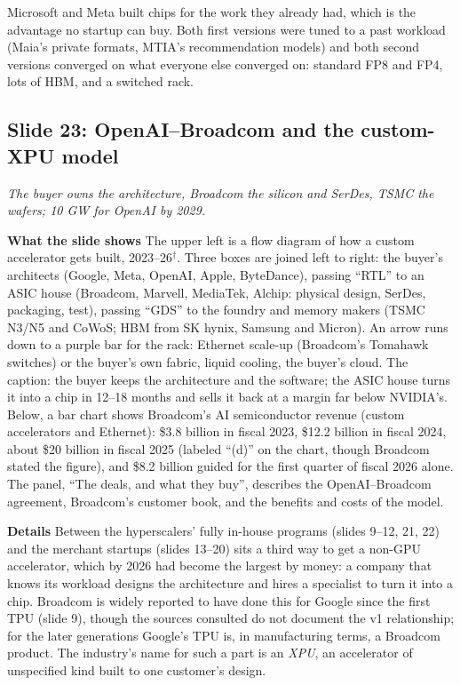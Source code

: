 \documentclass[11pt,letterpaper]{article}
\newcommand{\slide}[3]{%
  \subsection[Slide #1: #2]{Slide #1: #2}%
  {\color{muted}\itshape #3\par}\medskip}
\newcommand{\para}[1]{\medskip\noindent\textbf{#1}\quad}
\newenvironment{intuition}{\begin{tcolorbox}[intuitionbox]}{\end{tcolorbox}}
\begin{document}
\begin{intuition}
Microsoft and Meta built chips for the work they already had, which is the advantage no startup can buy. Both first versions were tuned to a past workload (Maia's private formats, MTIA's recommendation models) and both second versions converged on what everyone else converged on: standard FP8 and FP4, lots of HBM, and a switched rack.
\end{intuition}

\slide{23}{OpenAI--Broadcom and the custom-XPU model}{The buyer owns the architecture, Broadcom the silicon and SerDes, TSMC the wafers; 10 GW for OpenAI by 2029.}

\para{What the slide shows} The upper left is a flow diagram of how a custom accelerator gets built, 2023--26$^\dagger$. Three boxes are joined left to right: the buyer's architects (Google, Meta, OpenAI, Apple, ByteDance), passing ``RTL'' to an ASIC house (Broadcom, Marvell, MediaTek, Alchip: physical design, SerDes, packaging, test), passing ``GDS'' to the foundry and memory makers (TSMC N3/N5 and CoWoS; HBM from SK hynix, Samsung and Micron). An arrow runs down to a purple bar for the rack: Ethernet scale-up (Broadcom's Tomahawk switches) or the buyer's own fabric, liquid cooling, the buyer's cloud. The caption: the buyer keeps the architecture and the software; the ASIC house turns it into a chip in 12--18 months and sells it back at a margin far below NVIDIA's. Below, a bar chart shows Broadcom's AI semiconductor revenue (custom accelerators and Ethernet): \$3.8 billion in fiscal 2023, \$12.2 billion in fiscal 2024, about \$20 billion in fiscal 2025 (labeled ``(d)'' on the chart, though Broadcom stated the figure), and \$8.2 billion guided for the first quarter of fiscal 2026 alone. The panel, ``The deals, and what they buy'', describes the OpenAI--Broadcom agreement, Broadcom's customer book, and the benefits and costs of the model.

\para{Details} Between the hyperscalers' fully in-house programs (slides 9--12, 21, 22) and the merchant startups (slides 13--20) sits a third way to get a non-GPU accelerator, which by 2026 had become the largest by money: a company that knows its workload designs the architecture and hires a specialist to turn it into a chip. Broadcom is widely reported to have done this for Google since the first TPU (slide 9), though the sources consulted do not document the v1 relationship; for the later generations Google's TPU is, in manufacturing terms, a Broadcom product. The industry's name for such a part is an \emph{XPU}, an accelerator of unspecified kind built to one customer's design.
\end{document}
